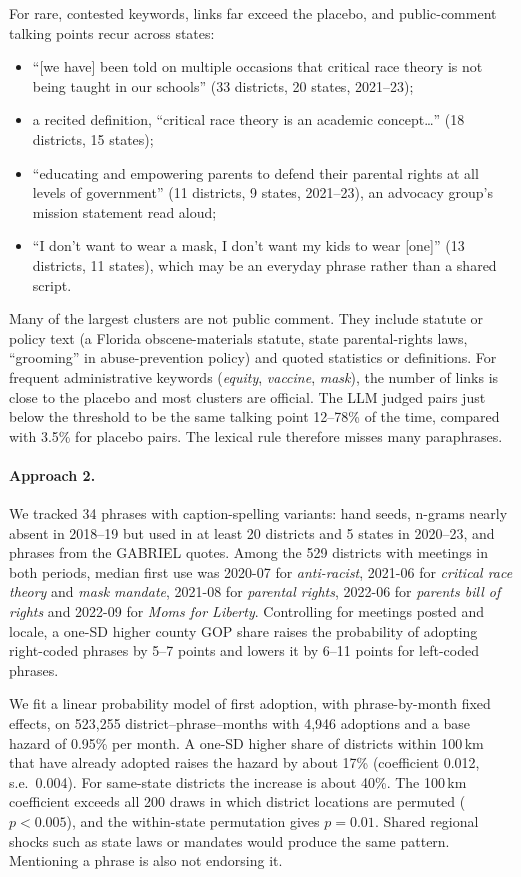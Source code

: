 For rare, contested keywords, links far exceed the placebo, and public-comment talking points
recur across states:
\begin{itemize}
  \item ``[we have] been told on multiple occasions that critical race theory is not being taught
  in our schools'' (33 districts, 20 states, 2021--23);
  \item a recited definition, ``critical race theory is an academic concept\ldots'' (18 districts,
  15 states);
  \item ``educating and empowering parents to defend their parental rights at all levels of
  government'' (11 districts, 9 states, 2021--23), an advocacy group's mission statement read aloud;
  \item ``I don't want to wear a mask, I don't want my kids to wear [one]'' (13 districts, 11
  states), which may be an everyday phrase rather than a shared script.
\end{itemize}
Many of the largest clusters are not public comment. They include statute or policy text (a Florida
obscene-materials statute, state parental-rights laws, ``grooming'' in abuse-prevention policy) and
quoted statistics or definitions. For frequent administrative keywords (\emph{equity},
\emph{vaccine}, \emph{mask}), the number of links is close to the placebo and most clusters are
official. The LLM judged pairs just below the threshold to be the same talking point 12--78\% of
the time, compared with 3.5\% for placebo pairs. The lexical rule therefore misses many
paraphrases.

\paragraph{Approach 2.} We tracked 34 phrases with caption-spelling variants: hand seeds, n-grams
nearly absent in 2018--19 but used in at least 20 districts and 5 states in 2020--23, and phrases
from the GABRIEL quotes. Among the 529 districts with meetings in both periods, median first use
was 2020-07 for \emph{anti-racist}, 2021-06 for \emph{critical race theory} and \emph{mask mandate},
2021-08 for \emph{parental rights}, 2022-06 for \emph{parents bill of rights} and 2022-09 for
\emph{Moms for Liberty}. Controlling for meetings posted and locale, a one-SD higher county GOP
share raises the probability of adopting right-coded phrases by 5--7 points and lowers it by 6--11
points for left-coded phrases.

We fit a linear probability model of first adoption, with phrase-by-month fixed effects, on
523,255 district--phrase--months with 4,946 adoptions and a base hazard of 0.95\% per month.
A one-SD higher share of districts within 100\,km that have already adopted raises the hazard by
about 17\% (coefficient 0.012, s.e.\ 0.004). For same-state districts the increase is about 40\%.
The 100\,km coefficient exceeds all 200 draws in which district locations are permuted
($p < 0.005$), and the within-state permutation gives $p = 0.01$. Shared regional shocks such as
state laws or mandates would produce the same pattern. Mentioning a phrase is also not endorsing it.

